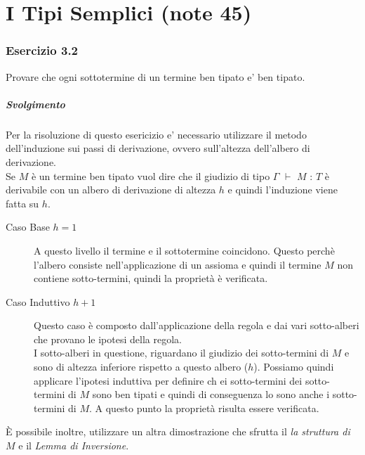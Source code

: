 \section{I Tipi Semplici (note 45)}
 
\subsubsection*{Esercizio 3.2}
Provare che ogni sottotermine di un termine ben tipato e' ben tipato.
\subparagraph{Svolgimento}
Per la risoluzione di questo esericizio e' necessario utilizzare il metodo dell'induzione sui passi di derivazione, ovvero sull'altezza dell'albero di derivazione.\\
Se $M$ \`e un termine ben tipato vuol dire che il giudizio di tipo $\Gamma$ $\vdash$ $M$ : $T$ \`e derivabile con un albero di derivazione di altezza $h$ e quindi l'induzione viene fatta su $h$.


\begin{description}

 \item[Caso Base $h=1$] A questo livello il termine e il sottotermine coincidono. Questo perch\`e l'albero consiste nell'applicazione di un assioma e quindi il termine $M$ non contiene sotto-termini, quindi la propriet\`a \`e verificata.

 \item[Caso Induttivo $h+1$ ] Questo caso \`e composto dall'applicazione della regola e dai vari sotto-alberi che provano le ipotesi della regola.\\I sotto-alberi in questione, riguardano il giudizio dei sotto-termini di $M$ e sono di altezza inferiore rispetto a questo albero ($h$). Possiamo quindi applicare l'ipotesi induttiva per definire ch ei sotto-termini dei sotto-termini di $M$ sono ben tipati e quindi di conseguenza lo sono anche i sotto-termini di $M$. A questo punto la propriet\`a risulta essere verificata.
 
 \end{description}
 
 \`E possibile inoltre, utilizzare un altra dimostrazione che sfrutta il \emph{la struttura di $M$} e il \emph{Lemma di Inversione}.
 
